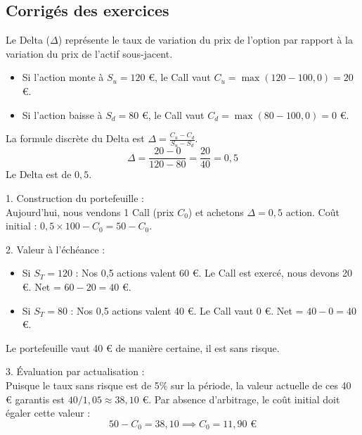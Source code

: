 \subsection{Corrigés des exercices}

\begin{correctionbox}
Le Delta ($\Delta$) représente le taux de variation du prix de l'option par rapport à la variation du prix de l'actif sous-jacent.
\begin{itemize}[label=$\cdot$]
    \item Si l'action monte à $S_u = 120$ €, le Call vaut $C_u = \max(120 - 100, 0) = 20$ €.
    \item Si l'action baisse à $S_d = 80$ €, le Call vaut $C_d = \max(80 - 100, 0) = 0$ €.
\end{itemize}
La formule discrète du Delta est $\Delta = \frac{C_u - C_d}{S_u - S_d}$.
\begin{equation*}
    \Delta = \frac{20 - 0}{120 - 80} = \frac{20}{40} = 0,5
\end{equation*}
Le Delta est de $0,5$.
\end{correctionbox}

\newpage

\begin{correctionbox}
1. Construction du portefeuille :\\
Aujourd'hui, nous vendons 1 Call (prix $C_0$) et achetons $\Delta = 0,5$ action. 
Coût initial : $0,5 \times 100 - C_0 = 50 - C_0$.

2. Valeur à l'échéance :\\
\begin{itemize}[label=$\cdot$]
    \item Si $S_T = 120$ : Nos 0,5 actions valent 60 €. Le Call est exercé, nous devons 20 €. Net = $60 - 20 = 40$ €.
    \item Si $S_T = 80$ : Nos 0,5 actions valent 40 €. Le Call vaut 0 €. Net = $40 - 0 = 40$ €.
\end{itemize}
Le portefeuille vaut 40 € de manière certaine, il est sans risque.

3. Évaluation par actualisation :\\
Puisque le taux sans risque est de 5\% sur la période, la valeur actuelle de ces 40 € garantis est $40 / 1,05 \approx 38,10$ €.
Par absence d'arbitrage, le coût initial doit égaler cette valeur :
\begin{equation*}
    50 - C_0 = 38,10 \implies C_0 = 11,90 \text{ €}
\end{equation*}
\end{correctionbox}

